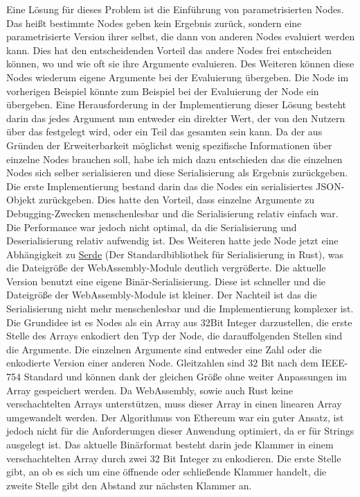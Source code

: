 \documentclass[ngerman]{article}
\begin{document}
Eine Lösung für dieses Problem ist die Einführung von parametrisierten Nodes. Das heißt bestimmte Nodes geben kein Ergebnis zurück, sondern eine parametrisierte Version ihrer selbst, die dann von anderen Nodes evaluiert werden kann.
\br
Dies hat den entscheidenden Vorteil das andere Nodes frei entscheiden können, wo und wie oft sie ihre Argumente evaluieren.
Des Weiteren können diese Nodes wiederum eigene Argumente bei der Evaluierung übergeben.
\br
Die  Node im vorherigen Beispiel könnte zum Beispiel bei der Evaluierung der  Node ein  übergeben.
\br
Eine Herausforderung in der Implementierung dieser Lösung besteht darin das jedes Argument nun entweder ein direkter Wert, der von den Nutzern über das  festgelegt wird, oder ein Teil das gesamten  sein kann.
\br
Da der  aus Gründen der Erweiterbarkeit möglichst wenig spezifische Informationen über einzelne Nodes brauchen soll,
habe ich mich dazu entschieden das die einzelnen Nodes sich selber serialisieren und diese Serialisierung als Ergebnis zurückgeben.
\br
Die erste Implementierung bestand darin das die Nodes ein serialisiertes JSON-Objekt zurückgeben. Dies hatte den Vorteil, dass einzelne Argumente zu Debugging-Zwecken menschenlesbar und die Serialisierung relativ einfach war. Die Performance war jedoch nicht optimal, da die Serialisierung und Deserialisierung relativ aufwendig ist. Des Weiteren hatte jede Node jetzt eine Abhängigkeit zu \href{ https://serde.rs/ }{Serde} (Der Standardbibliothek für Serialisierung in Rust), was die Dateigröße der WebAssembly-Module deutlich vergrößerte.
\br
Die aktuelle Version benutzt eine eigene Binär-Serialisierung. Diese ist schneller und die Dateigröße der WebAssembly-Module ist kleiner. Der Nachteil ist das die Serialisierung nicht mehr menschenlesbar und die Implementierung komplexer ist. 
\\
Die Grundidee ist es Nodes als ein Array aus 32Bit Integer darzustellen, die erste Stelle des Arrays enkodiert den Typ der Node, die darauffolgenden Stellen sind die Argumente. Die einzelnen Argumente sind entweder eine Zahl oder die enkodierte Version einer anderen Node.
Gleitzahlen sind 32 Bit nach dem IEEE-754 Standard und können dank der gleichen Größe ohne weiter Anpassungen im Array gespeichert werden. 
\br
Da WebAssembly, sowie auch Rust keine verschachtelten Arrays unterstützen, muss dieser Array in einen linearen Array umgewandelt werden. 
Der  Algorithmus von Ethereum war ein guter Ansatz, ist jedoch nicht für die Anforderungen dieser Anwendung optimiert, da er für Strings ausgelegt ist. 
\cite{wood2024ethereum}
\br
Das aktuelle Binärformat besteht darin jede Klammer in einem verschachtelten Array durch zwei 32 Bit Integer zu enkodieren. 
Die erste Stelle gibt, an ob es sich um eine öffnende oder schließende Klammer handelt, die zweite Stelle gibt den Abstand zur nächsten Klammer an.
\end{document}
